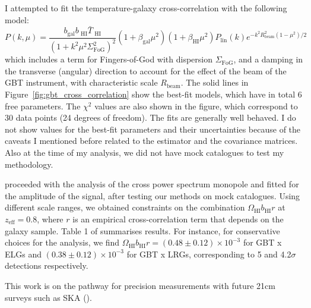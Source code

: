 I attempted to fit the temperature-galaxy cross-correlation with the following model:  
\begin{equation}
    P(k, \mu) = \frac{b_\text{gal}b_\text{ HI}\bar{T}_\text{ HI}}
                     {(1+k^2\mu^2\Sigma_\text{FoG}^2)^2}
                (1+\beta_\text{gal}\mu^2)(1+\beta_\text{HI}\mu^2)P_\text{lin}(k)e^{-k^2 R_\text{beam}^2(1-\mu^2)/2}
    \label{eq:model_hi_gal}
\end{equation}
which includes a term for Fingers-of-God with dispersion $\Sigma_\text{FoG}$,
and a damping in the transverse (angular) direction to account for the effect of the beam of the GBT instrument, with 
characteristic scale $R_\text{beam}$. 
The solid lines in Figure~\ref{fig:gbt_cross_correlation} show the best-fit models, which have in total 6 free parameters. 
The $\chi^2$ values are also shown in the figure, which correspond to 30 data points (24 degrees of freedom). 
The fits are generally well behaved. 
I do not show values for the best-fit parameters and their uncertainties because of the caveats I mentioned before
related to the estimator and the covariance matrices. Also at the time of my analysis, we did not have mock catalogues 
to test my methodology.  

\cite{wolzConstraintsCrosscorrelationEBOSS2022} proceeded with the analysis of the cross power spectrum monopole
and fitted for the amplitude of the signal, after testing our methods on mock catalogues. 
Using different scale ranges, we obtained constraints on the combination $\Omega_\text{HI}b_\text{HI}r$ at $z_\text{eff}=0.8$,
where $r$ is an empirical cross-correlation term that depends on the galaxy sample. 
Table 1 of \cite{wolzConstraintsCrosscorrelationEBOSS2022} summarises results. For instance, 
for conservative choices for the analysis, we find $\Omega_\text{HI}b_\text{HI}r = (0.48\pm0.12)\times 10^{-3}$ for GBT x ELGs 
and $(0.38\pm0.12)\times 10^{-3}$ for GBT x LRGs, corresponding to 5 and 4.2$\sigma$ detections respectively. 

This work is on the pathway for precision measurements with future 21cm surveys such as SKA 
(\cite{squarekilometrearraycosmologyscienceworkinggroupCosmologyPhaseSquare2020}).

